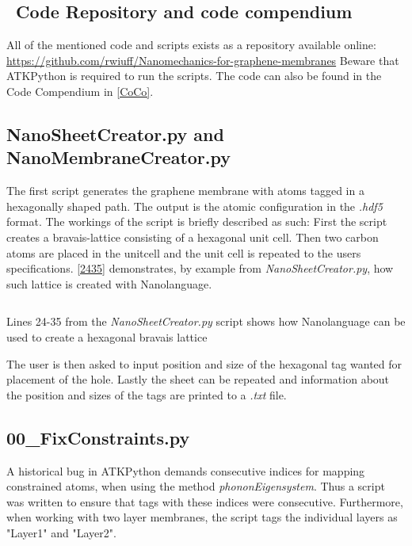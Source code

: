 \subsection{\faGithub \ Code Repository and code compendium}
All of the mentioned code and scripts exists as a repository available online:\newline
\url{https://github.com/rwiuff/Nanomechanics-for-graphene-membranes}
Beware that ATKPython\cite{QuantumWise} is required to run the scripts.
The code can also be found in the Code Compendium in \cref{CoCo}.
\subsection{NanoSheetCreator.py and NanoMembraneCreator.py}\label{NSCS}
The first script generates the graphene membrane with atoms tagged in a hexagonally shaped path. The output is the atomic configuration in the \textit{.hdf5} format.
The workings of the script is briefly described as such:
First the script creates a bravais-lattice consisting of a hexagonal unit cell. Then two carbon atoms are placed in the unitcell and the unit cell is repeated to the users specifications. \cref{2435} demonstrates, by example from \textit{NanoSheetCreator.py}, how such lattice is created with Nanolanguage.
\onecolumngrid

\begin{listing}[H]
 \inputminted[python3=true,bgcolor=Black,linenos=true,firstline=24,lastline=35]{python}{Listings/NanoSheetCreator.py}
 \caption{Lines 24-35 from the \textit{NanoSheetCreator.py} script shows how Nanolanguage can be used to create a hexagonal bravais lattice}
 \label{2435}
\end{listing}
\twocolumngrid
The user is then asked to input position and size of the hexagonal tag wanted for placement of the hole. Lastly the sheet can be repeated and information about the position and sizes of the tags are printed to a \textit{.txt} file.
\subsection{00\_FixConstraints.py}\label{00}
A historical bug in ATKPython demands consecutive indices for mapping constrained atoms, when using the method \textit{phononEigensystem}. Thus a script was written to ensure that tags with these indices were consecutive. Furthermore, when working with two layer membranes, the script tags the individual layers as "Layer1" and "Layer2".
